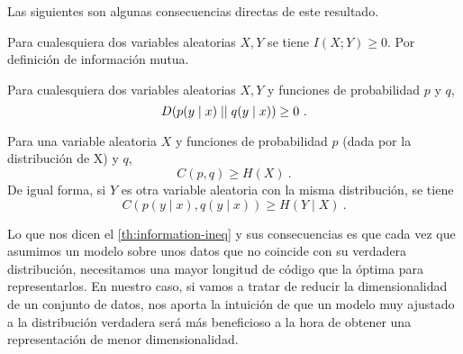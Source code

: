 \proofe
\theoe

Las siguientes son algunas consecuencias directas de este resultado.

Para cualesquiera dos variables aleatorias \(X, Y\) se tiene
\(I(X;Y)\geq 0\). \proofb
Por definición de información mutua. \proofe
\core

\corb
Para cualesquiera dos variables aleatorias \(X, Y\) y funciones de
probabilidad \(p\) y \(q\), \[D(p(y\mid x)\mid\mid q(y\mid x))\geq 0~.\]
\core

\corb
Para una variable aleatoria \(X\) y funciones de probabilidad \(p\)
(dada por la distribución de X) y \(q\), \[C(p, q)\geq H(X)~.\] De igual
forma, si \(Y\) es otra variable aleatoria con la misma distribución, se
tiene \[C(p(y\mid x), q(y\mid x))\geq H(Y\mid X)~.\] \core

Lo que nos dicen el \autoref{th:information-ineq} y sus consecuencias es que cada vez que asumimos un modelo sobre unos datos que no coincide con su verdadera distribución, necesitamos una mayor longitud de código que la óptima para representarlos. En nuestro caso, si vamos a tratar de reducir la dimensionalidad de un conjunto de datos, nos aporta la intuición de que un modelo muy ajustado a la distribución verdadera será más beneficioso a la hora de obtener una representación de menor dimensionalidad.